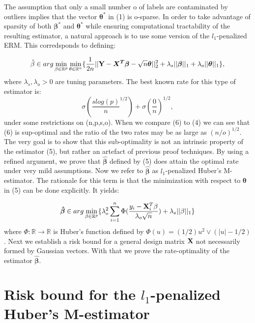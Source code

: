 \documentclass[a4paper,10pt]{article}
\theoremstyle{definition}
\begin{document}
The assumption that only a small number o of labels are contaminated by outliers implies that the vector $\boldsymbol{\theta}^*$ in (1) is o-sparse. In order to take advantage of sparsity of both $\boldsymbol{\beta}^*$ and $\boldsymbol{\theta}^*$ while ensuring computational tractability of the resulting estimator, a natural approach is to use some version of the $l_1$-penalized ERM. This corredsponds to defining:

\begin{equation}
	\hat{\bold{\beta}} \in arg
	\min\limits_{\bold{\beta}\in
	\mathbb{R}^p} \min\limits_{\bold{\theta}\in
	\mathbb{R}^n}\{\frac{1}{2n} ||\bold{Y} - \boldsymbol{X^T\beta} - \sqrt{n}\boldsymbol{\theta}||_2^2 + \lambda_s ||\boldsymbol{\beta}||_1 + \lambda_o||\boldsymbol{\theta}||_1\},
\end{equation}
where $\lambda_s, \lambda_o > 0$ are tuning parameters. The best known rate for this type of estimator is:
\begin{equation}
	\sigma (\frac{slog(p)}{n}^{1/2}) + \sigma(\frac{0}{n})^{1/2},
\end{equation}
under some restrictions on (n,p,s,o). When we compare (6) to (4) we can see that (6) is sup-optimal and the ratio of the two rates may be as large as $(n/o)^{1/2}$. \\
The very goal is to show that this sub-optimality is not an intrinsic property of the estimator (5), but rather an artefact of previous proof techniques. By using a refined argument, we prove that $\boldsymbol{\hat{\beta}}$ defined by (5) does attain the optimal rate under very mild assumptions.
Now we refer to $\boldsymbol{\hat{\beta}}$ as $l_1$-penalized Huber's M-estimator. The rationale for this term is that the minimization with respect to $\boldsymbol{\theta}$ in (5) can be done explicitly. It yields:

\begin{equation}
		\boldsymbol{\hat{\beta}} \in arg \min\limits_{\bold{\beta}\in
		\mathbb{R}^p} \{ \lambda_o^2 \sum_{i = 1}^{n}\Phi (\frac{y_i - \bold{X}^T_i \bold{\beta}}{\lambda_o \sqrt{n}}) + \lambda_s||\bold{\beta}||_1\}
\end{equation}
where $\Phi:\mathbb{R} \rightarrow \mathbb{R}$ is Huber's function defined by $\Phi (u) = (1/2)u^2 \vee (|u|-1/2)$.
Next we establish a risk bound for a general design matrix $\bold{X}$ not necessarily formed by Gaussian vectors. With that we prove the rate-optimality of the estimator $\boldsymbol{\hat{\beta}}$.


\newpage
\section{Risk bound for the $l_1$-penalized Huber’s M-estimator}\ \\
\end{document}
